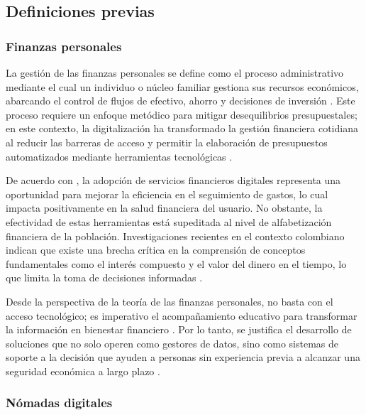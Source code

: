{}
\subsection*{Definiciones previas}

{}
\subsubsection*{Finanzas personales}

La gestión de las finanzas personales se define como el proceso administrativo mediante el cual un individuo o núcleo familiar gestiona sus recursos económicos, abarcando el control de flujos de efectivo, ahorro y decisiones de inversión \parencite{UniversidadLibre01}. Este proceso requiere un enfoque metódico para mitigar desequilibrios presupuestales; en este contexto, la digitalización ha transformado la gestión financiera cotidiana al reducir las barreras de acceso y permitir la elaboración de presupuestos automatizados mediante herramientas tecnológicas \parencite{CESA01}.

De acuerdo con \textcite{Asobancaria01}, la adopción de servicios financieros digitales representa una oportunidad para mejorar la eficiencia en el seguimiento de gastos, lo cual impacta positivamente en la salud financiera del usuario. No obstante, la efectividad de estas herramientas está supeditada al nivel de alfabetización financiera de la población. Investigaciones recientes en el contexto colombiano indican que existe una brecha crítica en la comprensión de conceptos fundamentales como el interés compuesto y el valor del dinero en el tiempo, lo que limita la toma de decisiones informadas \parencite[p.~4]{Departamento01}.

Desde la perspectiva de la teoría de las finanzas personales, no basta con el acceso tecnológico; es imperativo el acompañamiento educativo para transformar la información en bienestar financiero \parencite{Inclusionfinan01}. Por lo tanto, se justifica el desarrollo de soluciones que no solo operen como gestores de datos, sino como sistemas de soporte a la decisión que ayuden a personas sin experiencia previa a alcanzar una seguridad económica a largo plazo \parencite{Departamento01}.

{}
\subsubsection*{Nómadas digitales}

